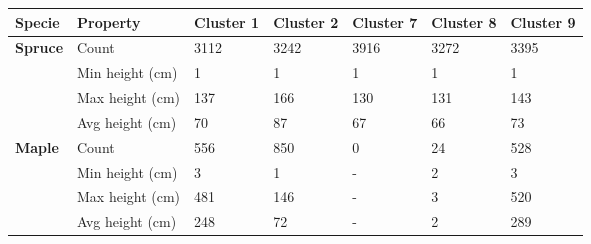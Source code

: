 \begin{table}[]
  \centering
	    \begin{tabular}{|p{2cm}|p{2cm}|p{1.5cm}|p{1.5cm}|p{1.5cm}|p{1.5cm}|p{1.5cm}|}
		\hline	
		\textbf{Specie} & \textbf{Property} & \textbf{Cluster 1} & \textbf{Cluster 2} & \textbf{Cluster 7} & \textbf{Cluster 8} & \textbf{Cluster 9} \\
		\hline
		\multirow{4}{*}{\textbf{Spruce}} & 
						\multicolumn{1}{l|}{Count} & 
						\multicolumn{1}{l|}{3112} & 
						\multicolumn{1}{l|}{3242} &
						\multicolumn{1}{l|}{3916} & 
						\multicolumn{1}{l|}{3272} & 
						\multicolumn{1}{l|}{3395} \\\cline{2-7} &
						\multicolumn{1}{l|}{Min height (cm)} & 
						\multicolumn{1}{l|}{1} & 
						\multicolumn{1}{l|}{1} &
						\multicolumn{1}{l|}{1} &
						\multicolumn{1}{l|}{1} & 
						\multicolumn{1}{l|}{1} \\\cline{2-7} &
						\multicolumn{1}{l|}{Max height (cm)} & 
						\multicolumn{1}{l|}{137} & 
						\multicolumn{1}{l|}{166} &
						\multicolumn{1}{l|}{130} &
						\multicolumn{1}{l|}{131} & 
						\multicolumn{1}{l|}{143} \\\cline{2-7} &
						\multicolumn{1}{l|}{Avg height (cm)} & 
						\multicolumn{1}{l|}{70} & 
						\multicolumn{1}{l|}{87} &
						\multicolumn{1}{l|}{67} &
						\multicolumn{1}{l|}{66} & 
						\multicolumn{1}{l|}{73} \\\cline{2-6}
		\hline       
		\multirow{4}{*}{\textbf{Maple}} & 
						\multicolumn{1}{l|}{Count} & 
						\multicolumn{1}{l|}{556} & 
						\multicolumn{1}{l|}{850} &
						\multicolumn{1}{l|}{0} &
						\multicolumn{1}{l|}{24} & 
						\multicolumn{1}{l|}{528} \\\cline{2-7} &
						\multicolumn{1}{l|}{Min height (cm)} & 
						\multicolumn{1}{l|}{3} & 
						\multicolumn{1}{l|}{1} &
						\multicolumn{1}{l|}{-} & 
						\multicolumn{1}{l|}{2} &
						\multicolumn{1}{l|}{3} \\\cline{2-7} &
						\multicolumn{1}{l|}{Max height (cm)} & 
						\multicolumn{1}{l|}{481} & 
						\multicolumn{1}{l|}{146} &
						\multicolumn{1}{l|}{-} & 
						\multicolumn{1}{l|}{3} &
						\multicolumn{1}{l|}{520} \\\cline{2-7} &
						\multicolumn{1}{l|}{Avg height (cm)} & 
						\multicolumn{1}{l|}{248} & 
						\multicolumn{1}{l|}{72} &
						\multicolumn{1}{l|}{-} & 
						\multicolumn{1}{l|}{2} &
						\multicolumn{1}{l|}{289} \\\cline{2-7}
		\hline      

\end{tabular}
\end{table}
